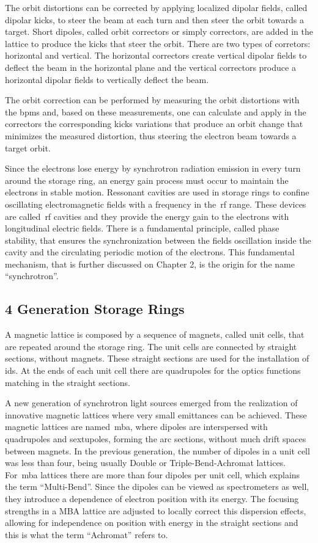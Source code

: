 The orbit distortions can be corrected by applying localized dipolar fields, called dipolar kicks, to steer the beam at each turn and then steer the orbit towards a target. Short dipoles, called orbit correctors or simply correctors, are added in the lattice to produce the kicks that steer the orbit. There are two types of corretors: horizontal and vertical. The horizontal correctors create vertical dipolar fields to deflect the beam in the horizontal plane and the vertical correctors produce a horizontal dipolar fields to vertically deflect the beam.

The orbit correction can be performed by measuring the orbit distortions with the \glspl{bpm} and, based on these measurements, one can calculate and apply in the correctors the corresponding kicks variations that produce an orbit change that minimizes the measured distortion, thus steering the electron beam towards a target orbit.

Since the electrons lose energy by synchrotron radiation emission in every turn around the storage ring, an energy gain process must occur to maintain the electrons in stable motion. Ressonant cavities are used in storage rings to confine oscillating electromagnetic fields with a frequency in the~\gls{rf} range. These devices are called~\gls{rf} cavities and they provide the energy gain to the electrons with longitudinal electric fields. There is a fundamental principle, called phase stability, that ensures the synchronization between the fields oscillation inside the cavity and the circulating periodic motion of the electrons. This fundamental mechanism, that is further discussed on Chapter 2, is the origin for the name ``synchrotron''.
\subsection{4 Generation Storage Rings}\label{subsec:fourth_generation}
A magnetic lattice is composed by a sequence of magnets, called unit cells, that are repeated around the storage ring. The unit cells are connected by straight sections, without magnets. These straight sections are used for the installation of \glspl{id}. At the ends of each unit cell there are quadrupoles for the optics functions matching in the straight sections.

A new generation of synchrotron light sources emerged from the realization of innovative magnetic lattices where very small emittances can be achieved. These magnetic lattices are named~\gls{mba}, where dipoles are interspersed with quadrupoles and sextupoles, forming the arc sections, without much drift spaces between magnets. In the previous generation, the number of dipoles in a unit cell was less than four, being usually Double or Triple-Bend-Achromat lattices. For~\gls{mba} lattices there are more than four dipoles per unit cell, which explains the term ``Multi-Bend''. Since the dipoles can be viewed as spectrometers as well, they introduce a dependence of electron position with its energy. The focusing strengths in a MBA lattice are adjusted to locally correct this dispersion effects, allowing for independence on position with energy in the straight sections and this is what the term ``Achromat'' refers to. 

